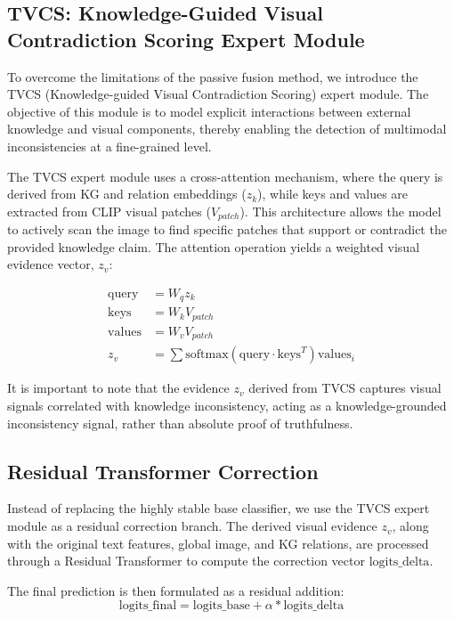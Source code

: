 \subsection{TVCS: Knowledge-Guided Visual Contradiction Scoring Expert Module}
To overcome the limitations of the passive fusion method, we introduce the TVCS (Knowledge-guided Visual Contradiction Scoring) expert module. The objective of this module is to model explicit interactions between external knowledge and visual components, thereby enabling the detection of multimodal inconsistencies at a fine-grained level.

The TVCS expert module uses a cross-attention mechanism, where the query is derived from KG and relation embeddings ($z_k$), while keys and values are extracted from CLIP visual patches ($V_{patch}$). This architecture allows the model to actively scan the image to find specific patches that support or contradict the provided knowledge claim. The attention operation yields a weighted visual evidence vector, $z_v$:

\begin{align}
    \text{query} &= W_q z_k \\
    \text{keys} &= W_k V_{patch} \\
    \text{values} &= W_v V_{patch} \\
    z_v &= \sum \text{softmax}(\text{query} \cdot \text{keys}^T) \text{values}_i
\end{align}

It is important to note that the evidence $z_v$ derived from TVCS captures visual signals correlated with knowledge inconsistency, acting as a knowledge-grounded inconsistency signal, rather than absolute proof of truthfulness.

\subsection{Residual Transformer Correction}
Instead of replacing the highly stable base classifier, we use the TVCS expert module as a residual correction branch. The derived visual evidence $z_v$, along with the original text features, global image, and KG relations, are processed through a Residual Transformer to compute the correction vector $\text{logits\_delta}$.

The final prediction is then formulated as a residual addition:
\begin{equation}
\text{logits\_final} = \text{logits\_base} + \alpha * \text{logits\_delta}
\end{equation}

